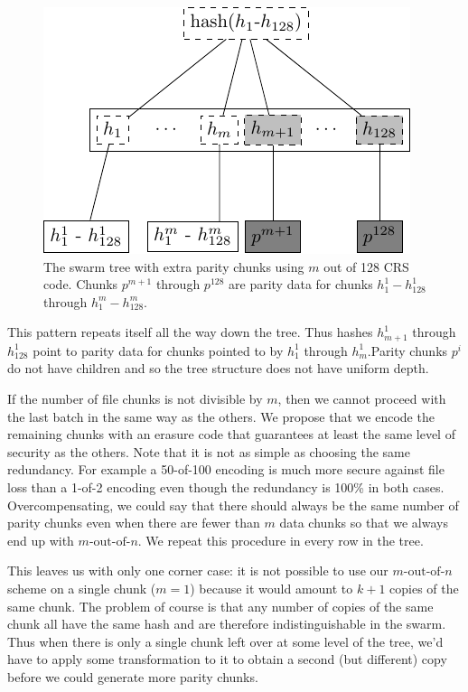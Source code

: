 \documentclass[12pt]{article}
\begin{document}
{\begin{figure}[htbp]
   \centering
   \includegraphics{fig/tree-with-erasure.pdf} %
   \caption{The swarm tree with extra parity chunks using $m$ out of 128 CRS code. Chunks $p^{m+1}$ through $p^{128}$ are parity data for chunks $h^1_1 - h^1_{128}$ through $h^{m}_1  - h^{m}_{128}$.}
   \label{fig:tree-with-erasure}
\end{figure}


This pattern repeats itself all the way down the tree. Thus hashes $h^1_{m+1}$ through $h^1_{128}$ point to parity data for chunks pointed to by $h^1_1$ through $h^1_{m}$.Parity chunks $p^i$ do not have children and so the tree structure does not have uniform depth.

If the number of file chunks is not divisible by $m$, then we cannot proceed with the last batch in the same way as the others. We propose that we encode the remaining chunks with an erasure code that guarantees at least the same level of security as the others. Note that it is not as simple as choosing the same redundancy. For example a 50-of-100 encoding is much more secure against file loss than a 1-of-2 encoding even though the redundancy is 100\% in both cases. Overcompensating, we could say that there should always be the same number of parity chunks even when there are fewer than $m$ data chunks so that we always end up with $m\text{-out-of-}n$. We repeat this procedure in every row in the tree.

This leaves us with only one corner case: it is not possible to use our $m\text{-out-of-}n$ scheme on a single chunk ($m=1$) because it would amount to $k+1$ copies of the same chunk. The problem of course is that any number of copies of the same chunk all have the same hash and are therefore indistinguishable in the swarm. Thus when there is only a single chunk left over at some level of the tree, we'd have to apply some transformation to it to obtain a second (but different) copy before we could generate more parity chunks.

}
\end{document}

